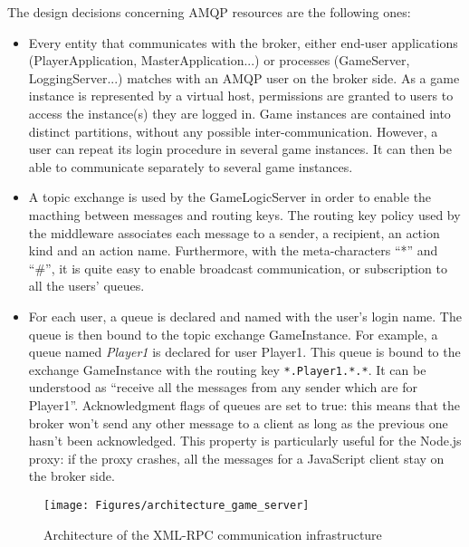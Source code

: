 The design decisions concerning AMQP resources are the following ones:
\begin{itemize}
\item Every entity that communicates with the broker, either end-user 
applications (PlayerApplication, MasterApplication...) or processes (GameServer,
 LoggingServer...) matches with an AMQP user on the broker side. As a game 
instance is represented by a virtual host, permissions are granted to users to
access the instance(s) they are logged in. Game instances are contained into 
distinct partitions, without any possible 
inter-communication. However, a user can repeat its login procedure in 
several game instances. It can then be able to communicate separately 
to several game instances.

\item A topic exchange is used by the GameLogicServer in order to enable the 
macthing between messages and routing keys. The routing key policy used by the 
middleware associates each message to a sender, a recipient, an action kind and 
an action name. Furthermore, with the meta-characters ``*'' and ``\#'', it is 
quite easy to enable broadcast communication, or subscription to all the users' 
queues.

\item For each user, a queue is declared and named with the user's login 
name. The queue is then
bound to the topic exchange GameInstance. For example, a queue named \textit{
Player1} is declared for user Player1. This queue is bound to the exchange 
GameInstance with the routing key \texttt{*.Player1.*.*}. 
It can be understood as ``receive all the messages from any sender which are 
for Player1''. Acknowledgment flags of 
queues are set to true: this means that the broker won't send any other message
to a client as long as the previous one hasn't been acknowledged. This property 
is particularly useful for the \textsf{Node.js} proxy: if the proxy crashes, 
all the messages for a JavaScript client stay on the broker side.

\end{itemize}

\begin{figure}[htbp!]
\begin{center}
\texttt{[image: Figures/architecture\_game\_server]}
\caption{Architecture of the XML-RPC communication infrastructure}
\label{F_architecture_game_server}
\end{center}
\end{figure}

